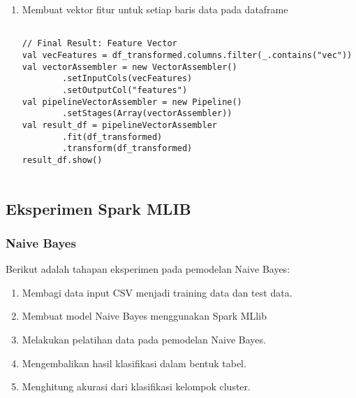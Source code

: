 \begin{enumerate}
\begin{lstlisting}[basicstyle=\ttfamily, frame=single,
	columns=fullflexible, keepspaces=true, breaklines=true, label=ls_kepatuhan_1_1_1_logo_sharif_judge, caption=Main method]
\end{lstlisting}

\item Membuat vektor fitur untuk setiap baris data pada dataframe
\begin{lstlisting}[basicstyle=\ttfamily, frame=single,
	columns=fullflexible, keepspaces=true, breaklines=true, label=ls_kepatuhan_1_1_1_logo_sharif_judge, caption=Main method]
	
// Final Result: Feature Vector
val vecFeatures = df_transformed.columns.filter(_.contains("vec"))
val vectorAssembler = new VectorAssembler()
		.setInputCols(vecFeatures)
		.setOutputCol("features")
val pipelineVectorAssembler = new Pipeline()
		.setStages(Array(vectorAssembler))
val result_df = pipelineVectorAssembler
		.fit(df_transformed)
		.transform(df_transformed)
result_df.show()
	
\end{lstlisting}

\end{enumerate}




\subsection{Eksperimen Spark MLIB}

\subsubsection{Naive Bayes}
\noindent Berikut adalah tahapan eksperimen pada pemodelan Naive Bayes:
\begin{enumerate}
\item Membagi data input CSV menjadi training data dan test data.
\item Membuat model Naive Bayes menggunakan Spark MLlib
\item Melakukan pelatihan data pada pemodelan Naive Bayes.
\item Mengembalikan hasil klasifikasi dalam bentuk tabel.
\item Menghitung akurasi dari klasifikasi kelompok cluster.
\end{enumerate}	

